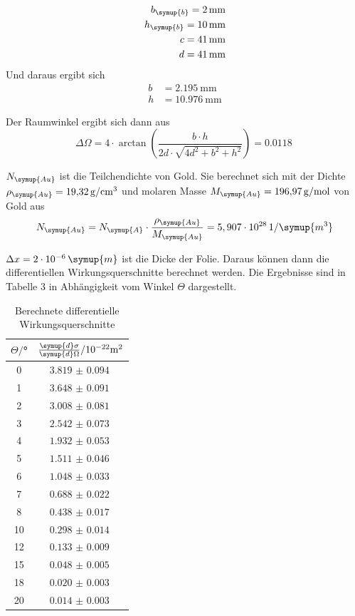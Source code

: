 \begin{align*}
  b_\symup{b} = \SI{2}{\milli\meter} \\
  h_\symup{b} = \SI{10}{\milli\meter} \\
  c = \SI{41}{\milli\meter} \\
  d = \SI{41}{\milli\meter}
\end{align*}
Und daraus ergibt sich
\begin{align*}
  b &= \SI{2.195}{\milli\meter} \\
  h &= \SI{10.976}{\milli\meter}
\end{align*}

Der Raumwinkel ergibt sich dann aus \cite{sample2}
\begin{equation}
  \Delta \Omega = 4 \cdot \arctan\left(\frac{b \cdot h}{2d \cdot \sqrt{4d^2 + b^2 + h^2}}\right) = \SI{0.0118}{}
\end{equation}

$N_\symup{Au}$ ist die Teilchendichte von Gold. Sie berechnet sich mit der Dichte
$\rho_\symup{Au} = \SI{19.32}{\gram\per\centi\meter^3}$ \cite{sample} und molaren Masse $M_\symup{Au} = \SI{196.97}{\gram\per\mol}$ \cite{sample}
von Gold aus
\begin{equation}
  N_\symup{Au} = N_\symup{A} \cdot \frac{\rho_\symup{Au}}{M_\symup{Au}} = 5,907 \cdot 10^{28} \, 1/\symup{m^3}
  \label{eqn:teilchendichte}
\end{equation}


$\Delta x = 2 \cdot 10^{-6} \, \symup{m}$ ist die Dicke der Folie. Daraus können dann die
differentiellen Wirkungsquerschnitte berechnet werden. Die Ergebnisse sind in Tabelle 3
in Abhängigkeit vom Winkel $\Theta$ dargestellt.


\begin{table}[H]
  \centering
  \caption{Berechnete differentielle Wirkungsquerschnitte}
  \label{tab:Parameter}
  \begin{tabular}{c c}
    \toprule
    $\Theta/$° & $\frac{\symup{d}\sigma}{\symup{d}\Omega}/ \mathrm{10^{-22}m^2}$ \\
    \midrule
     0  &  $\SI{3.819(94)}{}$  \\
     1  &  $\SI{3.648(91)}{}$  \\
     2  &  $\SI{3.008(81)}{}$  \\
     3  &  $\SI{2.542(73)}{}$  \\
     4  &  $\SI{1.932(53)}{}$  \\
     5  &  $\SI{1.511(46)}{}$  \\
     6  &  $\SI{1.048(33)}{}$  \\
     7  &  $\SI{0.688(22)}{}$  \\
     8  &  $\SI{0.438(17)}{}$  \\
    10  &  $\SI{0.298(14)}{}$  \\
    12  &  $\SI{0.133(9)}{}$  \\
    15  &  $\SI{0.048(5)}{}$  \\
    18  &  $\SI{0.020(3)}{}$  \\
    20  &  $\SI{0.014(3)}{}$  \\
      \bottomrule
  \end{tabular}
\end{table}

